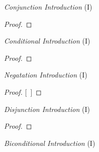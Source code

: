 \documentclass[a4paper, 11pt]{article} %
\begin{document}
\iffalse

\begin{multicols}{2}


\textit{Conjunction Introduction} (\eand I) \vspace{-1em}
\begin{proof}
	 
	 
\end{proof}

\vspace{1em}

\textit{Conditional Introduction} (\eif I) \vspace{-1em}
\begin{proof}
	\open
	\close
\end{proof}

\vspace{0.6em}

\textit{Negatation Introduction} (\enot I) \vspace{-1em}
\begin{proof}
\open
	\metaA{}    %
	\metaB{}
\close
{}[\ ]{\enot\metaA{}}
\end{proof}

\vspace{0.6em}

\textit{Disjunction Introduction} (\eor I) \vspace{-1em}

\begin{proof}
\end{proof}

\vspace{0.6em}

\textit{Biconditional Introduction} (\eiff I) \vspace{-1em}

\begin{fitchproof}
	\open
		 
	\close
\breakline
	\open
		 
	\close
\end{fitchproof}



\end{multicols}
\end{document}
